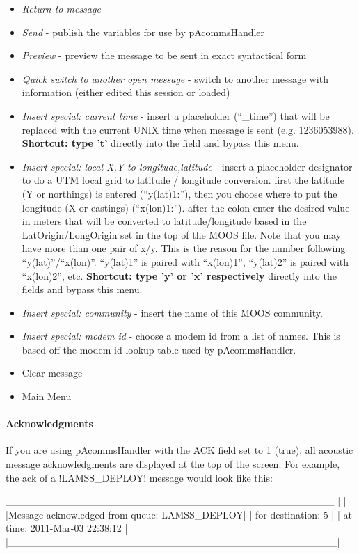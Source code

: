 \begin{itemize}
\item \textit{Return to message}
\item \textit{Send} - publish the variables for use by pAcommsHandler
\item \textit{Preview} - preview the message to be sent in exact syntactical form
\item \textit{Quick switch to another open message} - switch to another message with information (either edited this session or loaded)
\item \textit{Insert special: current time} - insert a placeholder (``\_time'') that will be replaced with the current UNIX time when message is sent (e.g. 1236053988). \textbf{Shortcut: type 't'} directly into the field and bypass this menu.
\item \textit{Insert special: local X,Y to longitude,latitude} - insert a placeholder designator to do a UTM local grid to latitude / longitude conversion. first the latitude (Y or northings) is entered (``y(lat)1:''), then you choose where to put the longitude (X or eastings) (``x(lon)1:''). after the colon enter the desired value in meters that will be converted to latitude/longitude based in the LatOrigin/LongOrigin set in the top of the MOOS file. Note that you may have more than one pair of x/y. This is the reason for the number following ``y(lat)''/``x(lon)''. ``y(lat)1'' is paired with ``x(lon)1'', ``y(lat)2'' is paired with ``x(lon)2'', etc. \textbf{Shortcut: type 'y' or 'x' respectively} directly into the fields and bypass this menu.
\item \textit{Insert special: community} - insert the name of this MOOS community.
\item \textit{Insert special: modem id} - choose a modem id from a list of names. This is based off the modem id lookup table used by pAcommsHandler.
\item Clear message
\item Main Menu
\end{itemize}

\paragraph{Acknowledgments}
If you are using pAcommsHandler with the ACK field set to 1 (true), all acoustic message acknowledgments are displayed at the top of the screen. For example, the ack of a !LAMSS_DEPLOY! message would look like this:
\begin{boxedverbatim}
 _____________________________________________
|                                             |
|Message acknowledged from queue: LAMSS_DEPLOY|
| for destination: 5                          |
| at time: 2011-Mar-03 22:38:12               |
|_____________________________________________|
\end{boxedverbatim}
\resetbvlinenumber

